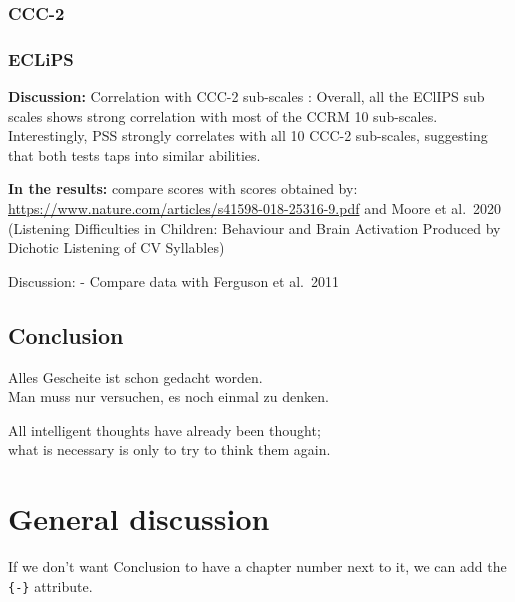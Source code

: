 \documentclass[a4paper, twoside]{templates/ociamthesis}
\begin{document}
\hypertarget{ccc-2-1}{%
\subsection{CCC-2}\label{ccc-2-1}}

\hypertarget{eclips-1}{%
\subsection{ECLiPS}\label{eclips-1}}

\textbf{Discussion:} Correlation with CCC-2 sub-scales \autocite{Barry2014}: Overall, all the EClIPS sub scales shows strong correlation with most of the CCRM 10 sub-scales. Interestingly, PSS strongly correlates with all 10 CCC-2 sub-scales, suggesting that both tests taps into similar abilities.

\textbf{In the results:} compare scores with scores obtained by: \url{https://www.nature.com/articles/s41598-018-25316-9.pdf} and Moore et al.~2020 (Listening Difficulties in Children: Behaviour and Brain Activation Produced by Dichotic Listening of CV Syllables)

Discussion: - Compare data with Ferguson et al.~2011

\hypertarget{conclusion-2}{%
\section{Conclusion}\label{conclusion-2}}

\clearpage

\begin{savequote}
Alles Gescheite ist schon gedacht worden.\\
Man muss nur versuchen, es noch einmal zu denken.

All intelligent thoughts have already been thought;\\
what is necessary is only to try to think them again.
\end{savequote}



\hypertarget{general-discussion}{%
\chapter*{General discussion}\label{general-discussion}}

If we don't want Conclusion to have a chapter number next to it, we can add the \texttt{\{-\}} attribute.
\end{document}
